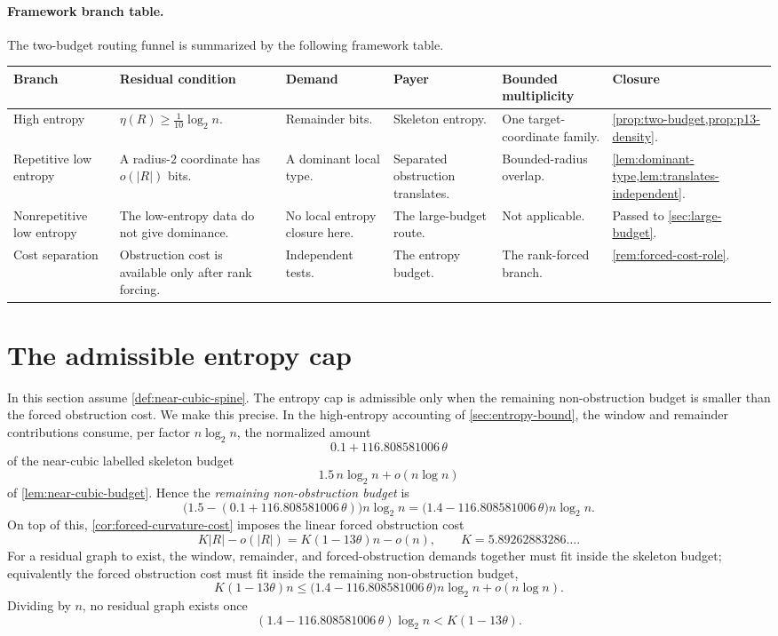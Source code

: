 \documentclass[11pt]{article}
\newcommand{\FrameworkBranchTableHeader}{%
\toprule
\textbf{Branch} & \textbf{Residual condition} & \textbf{Demand} & \textbf{Payer} & \textbf{Bounded multiplicity} & \textbf{Closure}\\
\midrule
}
\begin{document}
\paragraph{Framework branch table.}
The two-budget routing funnel is summarized by the following framework table.
\begin{longtable}{L{0.13\textwidth} L{0.19\textwidth} L{0.14\textwidth} L{0.14\textwidth} L{0.17\textwidth} L{0.17\textwidth}}
\FrameworkBranchTableHeader
High entropy
&
\(\eta(R)\ge\frac1{10}\log_2 n\).
&
Remainder bits.
&
Skeleton entropy.
&
One target-coordinate family.
&
\cref{prop:two-budget,prop:p13-density}.
\\
\addlinespace
Repetitive low entropy
&
A radius-\(2\) coordinate has \(o(|R|)\) bits.
&
A dominant local type.
&
Separated obstruction translates.
&
Bounded-radius overlap.
&
\cref{lem:dominant-type,lem:translates-independent}.
\\
\addlinespace
Nonrepetitive low entropy
&
The low-entropy data do not give dominance.
&
No local entropy closure here.
&
The large-budget route.
&
Not applicable.
&
Passed to \cref{sec:large-budget}.
\\
\addlinespace
Cost separation
&
Obstruction cost is available only after rank forcing.
&
Independent tests.
&
The entropy budget.
&
The rank-forced branch.
&
\cref{rem:forced-cost-role}.
\\
\bottomrule
\end{longtable}

\section{The admissible entropy cap}

In this section assume \cref{def:near-cubic-spine}.  The entropy cap is
admissible only when the remaining non-obstruction budget is smaller than the
forced obstruction cost.  We make this precise.  In the high-entropy accounting of
\cref{sec:entropy-bound}, the window and remainder contributions consume, per
factor $n\log_2 n$, the normalized amount
\[
0.1+116.808581006\,\theta
\]
of the near-cubic labelled skeleton budget
\[
1.5\,n\log_2 n+o(n\log n)
\]
of \cref{lem:near-cubic-budget}.  Hence the \emph{remaining non-obstruction budget} is
\[
\bigl(1.5-(0.1+116.808581006\,\theta)\bigr)n\log_2 n=\bigl(1.4-116.808581006\,\theta\bigr)n\log_2 n .
\]
On top of this, \cref{cor:forced-curvature-cost} imposes the linear forced obstruction cost
\[
K|R|-o(|R|)=K(1-13\theta)n-o(n),\qquad K=5.89262883286\ldots .
\]
For a residual graph to exist, the window, remainder, and forced-obstruction demands together must fit inside the skeleton budget; equivalently the forced obstruction cost must fit inside the remaining non-obstruction budget,
\[
K(1-13\theta)n\le\bigl(1.4-116.808581006\,\theta\bigr)n\log_2 n+o(n\log n).
\]
Dividing by $n$, no residual graph exists once
\begin{equation}\label{eq:entropy-cap}
\left(1.4-116.808581006\,\theta\right)\log_2 n
< K(1-13\theta).
\end{equation}
\end{document}
